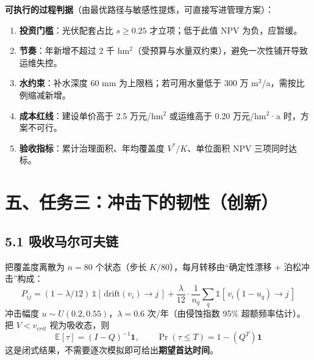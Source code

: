 \documentclass[11pt,a4paper]{ctexart}
\begin{document}
\textbf{可执行的过程判据}（由最优路径与敏感性提炼，可直接写进管理方案）：
\begin{enumerate}
\item \textbf{投资门槛}：光伏配套占比 $s\ge 0.25$ 才立项；低于此值 NPV 为负，应暂缓。
\item \textbf{节奏}：年新增不超过 2 千 hm$^2$（受预算与水量双约束），避免一次性铺开导致运维失控。
\item \textbf{水约束}：补水深度 60 mm 为上限档；若可用水量低于 300 万 m$^3$/a，需按比例缩减新增。
\item \textbf{成本红线}：建设单价高于 2.5 万元/hm$^2$ 或运维高于 0.20 万元/hm$^2$·a 时，方案不可行。
\item \textbf{验收指标}：累计治理面积、年均覆盖度 $V^*/K$、单位面积 NPV 三项同时达标。
\end{enumerate}

\section*{五、任务三：冲击下的韧性（创新）}
\subsection*{5.1 吸收马尔可夫链}
把覆盖度离散为 $n=80$ 个状态（步长 $K/80$），每月转移由“确定性漂移 + 泊松冲击”构成：
\begin{equation}
P_{ij}=(1-\lambda/12)\,\mathbb{1}[\,\text{drift}(v_i)\to j\,]+\frac{\lambda}{12}\cdot\frac{1}{n_q}\sum_{q}\mathbb{1}[\,v_i(1-u_q)\to j\,]
\end{equation}
冲击幅度 $u\sim U(0.2,0.55)$，$\lambda=0.6$ 次/年（由侵蚀指数 95\% 超额频率估计）。
把 $V<v_{crit}$ 视为吸收态，则
\begin{equation}
\mathbb{E}[\tau]=(I-Q)^{-1}\mathbf{1},\qquad
\Pr(\tau\le T)=1-\left(Q^{T}\right)\mathbf{1}
\end{equation}
这是闭式结果，不需要逐次模拟即可给出\textbf{期望首达时间}。
\end{document}
